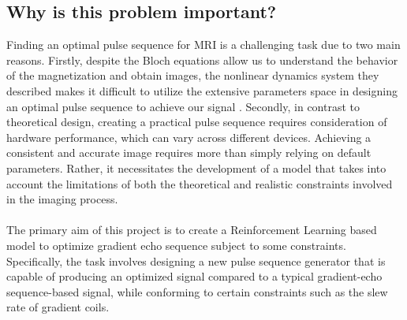 \subsection{Why is this problem important?}
Finding an optimal pulse sequence for MRI is a challenging task due to two main reasons. Firstly, despite the Bloch equations allow us to understand the behavior of the magnetization and obtain images, the nonlinear dynamics system they described makes it difficult to utilize the extensive parameters space in designing an optimal pulse sequence to achieve our signal \citep{0438}. Secondly, in contrast to theoretical design, creating a practical pulse sequence requires consideration of hardware performance, which can vary across different devices. Achieving a consistent and accurate image requires more than simply relying on default parameters. Rather, it necessitates the development of a model that takes into account the limitations of both the theoretical and realistic constraints involved in the imaging process. 
\\\\
The primary aim of this project is to create a Reinforcement Learning based model to optimize gradient echo sequence subject to some constraints. Specifically, the task involves designing a new pulse sequence generator that is capable of producing an optimized signal compared to a typical gradient-echo sequence-based signal, while conforming to certain constraints such as the slew rate of gradient coils.
